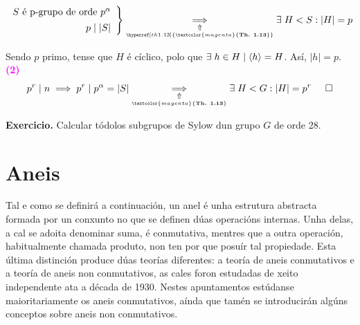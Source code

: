 \documentclass[twoside]{report}
\newcommand{\magbf}[1]{\textcolor{magenta}{\textbf{#1}}} %
\theoremstyle{mystyle}
\begin{document}
    \[ 
    \left. \begin{array}{r} 
    S \text{ é p-grupo de orde } p^{\alpha} \\[1ex]
    p \hspace{1mm} | \hspace{1mm} |S| 
    \end{array} \right\} 
    \underset{\underset{\hyperref[th1.13]{\magbf{Th. 1.13}}}{\Uparrow}}{\implies} \exists \hspace{1mm} H < S : |H| = p\\
    \]

\noindent Sendo $p$ primo, tense que $H$ é cíclico, polo que $\exists \hspace{1mm} h \in H \hspace{1mm} | \hspace{1mm} \langle h \rangle = H$. Así, $|h| = p$.\\

\noindent \magbf{(2)} $$p^r \hspace{1mm} | \hspace{1mm} n \implies p^{r} \hspace{1mm} | \hspace{1mm} p^{\alpha} = |S| \underset{\underset{\magbf{Th. 1.13}}{\Uparrow}}{\implies} \exists \hspace{1mm} H < G : |H| = p^{r} \hspace{5mm} \square$$

\vspace{5mm}

\noindent \textbf{Exercicio.} Calcular tódolos subgrupos de Sylow dun grupo $G$ de orde 28. %


\chapter[Unidade 2. Aneis]{\textbf{Aneis}}

\thispagestyle{noheader}

\noindent Tal e como se definirá a continuación, un anel é unha estrutura abstracta formada por un conxunto no que se definen dúas operacións internas. Unha delas, a cal se adoita denominar suma, é conmutativa, mentres que a outra operación, habitualmente chamada produto, non ten por que posuír tal propiedade. Esta última distinción produce dúas teorías diferentes: a teoría de aneis conmutativos e a teoría de aneis non conmutativos, as cales foron estudadas de xeito independente ata a década de 1930. Nestes apuntamentos estúdanse maioritariamente os aneis conmutativos, aínda que tamén se introducirán algúns conceptos sobre aneis non conmutativos.\\
\end{document}
